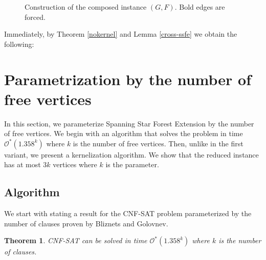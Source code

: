 \documentclass[en]{pracamgr}
\newtheorem{theorem}{Theorem}
\theoremstyle{definition}
\newcommand{\ssfep}{{\sc Spanning Star Forest Extension}}
\newcommand{\cnfsat}{{\sc CNF-SAT}}
\begin{document}
\begin{figure}
	\caption{Construction of the composed instance $(G,F)$. Bold edges are forced.}
	\label{fig1}
\end{figure}


Immediately, by Theorem \ref{nokernel} and Lemma \ref{cross-ssfe} we obtain the following:

\thmssfepnokernel*

\section{Parametrization by the number of free vertices}

In this section, we parameterize  \ssfep{} by the number of free vertices. We begin with an algorithm that solves the problem in time $\mathcal{O}^*(1.358^k)$ where $k$ is the number of free vertices. Then, unlike in the first variant, we present a kernelization algorithm. We show that the reduced instance has at most $3k$ vertices where $k$ is the parameter.

\subsection{Algorithm}
We start with stating a result for the \cnfsat{} problem parameterized by the number of clauses proven by Bliznets and Golovnev. \cite{MAXSAT}

\begin{theorem}\label{cnfsatmtime}
	\cnfsat{} can be solved in time $\mathcal{O}^*(1.358^k)$ where $k$ is the number of clauses.
\end{theorem}
\end{document}
